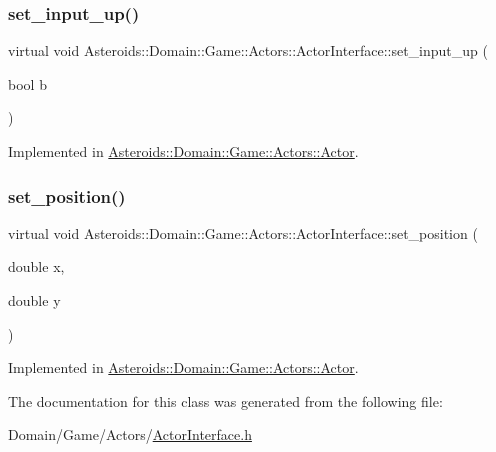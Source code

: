 \subsubsection{\texorpdfstring{set\+\_\+input\+\_\+up()}{set\_input\_up()}}
{\footnotesize\ttfamily virtual void Asteroids\+::\+Domain\+::\+Game\+::\+Actors\+::\+Actor\+Interface\+::set\+\_\+input\+\_\+up (\begin{DoxyParamCaption}\item[{bool}]{b }\end{DoxyParamCaption})\hspace{0.3cm}{\ttfamily [pure virtual]}}



Implemented in \hyperlink{classAsteroids_1_1Domain_1_1Game_1_1Actors_1_1Actor_ad633a650d229eee0e3b35f1495d35473}{Asteroids\+::\+Domain\+::\+Game\+::\+Actors\+::\+Actor}.

\mbox{\label{classAsteroids_1_1Domain_1_1Game_1_1Actors_1_1ActorInterface_a7b1c2b10db2671640979619ca904474a}} 
\subsubsection{\texorpdfstring{set\+\_\+position()}{set\_position()}}
{\footnotesize\ttfamily virtual void Asteroids\+::\+Domain\+::\+Game\+::\+Actors\+::\+Actor\+Interface\+::set\+\_\+position (\begin{DoxyParamCaption}\item[{double}]{x,  }\item[{double}]{y }\end{DoxyParamCaption})\hspace{0.3cm}{\ttfamily [pure virtual]}}



Implemented in \hyperlink{classAsteroids_1_1Domain_1_1Game_1_1Actors_1_1Actor_aa572cc87c0d07330348c811d778aa314}{Asteroids\+::\+Domain\+::\+Game\+::\+Actors\+::\+Actor}.



The documentation for this class was generated from the following file\+:\begin{DoxyCompactItemize}
\item 
Domain/\+Game/\+Actors/\hyperlink{ActorInterface_8h}{Actor\+Interface.\+h}\end{DoxyCompactItemize}
